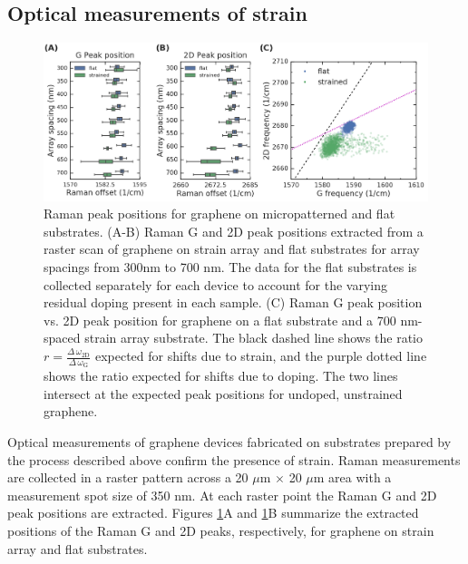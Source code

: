 \documentclass[edeposit,fullpage,draftthesis]{uiucthesis2009}
\begin{document}
    \subsection{Optical measurements of strain}
    
            \begin{figure}
            \centering
            \includegraphics[width=\columnwidth]{images/resultsanddiscussion/strainarraypaper/Figure3}
            \caption[Raman measurements of graphene on strain array substrates]
                {Raman peak positions for graphene on micropatterned and flat substrates. 
                (A-B) Raman G and 2D peak positions extracted from a raster scan of graphene on
                strain array and flat substrates for array spacings from 300nm to 700 nm. The 
                data for the flat substrates is collected separately for each device to account for
                the varying residual doping present in each sample.
                (C) Raman G peak position vs. 2D peak position for graphene on a flat substrate
                and a 700 nm-spaced strain array substrate. The black dashed line shows the ratio 
                $r = \frac{\Delta \, \omega_\text{2D}}{\Delta \, \omega_\text{G}}$ expected for shifts due to
                strain, and the purple dotted line shows the ratio expected for shifts due to doping.
                The two lines intersect at the expected peak positions for undoped, unstrained graphene.
                }
            \label{'fig:raman'}
            \end{figure}
            
            Optical measurements of graphene devices fabricated on substrates prepared by the process described above
            confirm the presence of strain. Raman measurements are collected in a raster pattern across a 
            20 $\mu$m  $\times$ 20 $\mu$m area with a measurement spot size of 350 nm. 
            At each raster point the Raman G and 2D peak positions are extracted\cite{ferrari2006raman}. 
            Figures \ref{'fig:raman'}A and \ref{'fig:raman'}B summarize the extracted positions 
            of the Raman G and 2D peaks, respectively, for graphene on strain array and flat substrates.  
            
\end{document}
